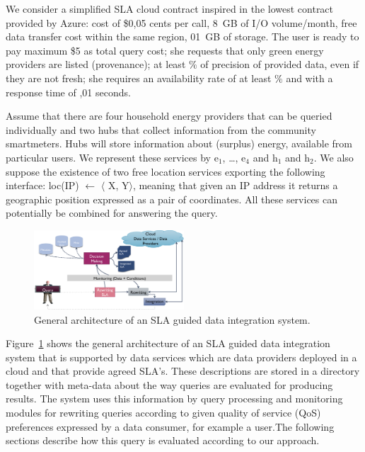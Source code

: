 We consider a simplified SLA cloud contract inspired in the lowest contract provided by Azure: {\sf cost of \$0,05 cents per call,  8~GB of I/O volume/month, free data transfer cost within the same region,  01~GB of storage}. 
The user is ready to pay maximum {\sf \$5 as total query cost}; she requests that only {\sf green} energy providers are listed (provenance); at least {$\%$} of precision of provided data, even if they are not fresh; she requires an availability rate of at least {$\%$} and with a response time of {,01 seconds}.
 
Assume that there are four household energy providers that can be queried individually and two hubs that collect information from the community smartmeters.
Hubs will store information about (surplus) energy, available from particular users.
We represent these services by {\sf e$_1$, \dots, e$_4$} and {\sf h$_1$ and h$_2$}.
We also suppose the existence of two free location services exporting the following interface: {\sf loc(IP) $\leftarrow$ $\langle$ X, Y$\rangle$}, meaning that given an IP address it returns a geographic position expressed as a pair of coordinates. 
All these services can potentially be combined for answering the query.

\begin{figure}
\includegraphics[width=0.5\textwidth]{figs/arch.png}
\caption{General architecture of an SLA guided  data integration system.\label{fig:arch}}
\end{figure}

Figure~\ref{fig:arch} shows the general architecture of an SLA guided data integration system that is supported by data services which are data providers deployed in a cloud and that provide agreed SLA’s. 
These descriptions are stored in a directory together with meta-data about the way queries are evaluated for producing results. 
The system uses this information  by query processing and monitoring modules for rewriting queries according to given quality of service (QoS) preferences expressed by a data consumer, for example a user.The following sections describe how this query is evaluated according to our approach. 




